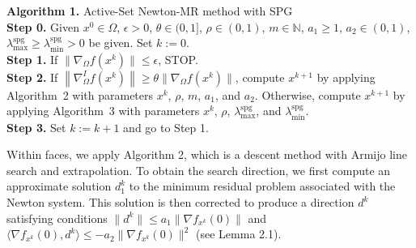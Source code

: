 \documentclass[11pt]{article}
\begin{document}
\begin{mdframed}
\noindent\textbf{Algorithm 1.} Active-Set Newton-MR method with SPG 
\\[0.2cm]
\noindent\textbf{Step 0.} Given $x^{0}\in\Omega$, $\epsilon>0$, $\theta \in (0,1]$, $\rho\in (0,1)$, $m\in\mathbb{N}$, $a_{1}\geq 1$, $a_2\in(0,1)$, $\lambda_{\max}^{\mathrm{spg}} \geq \lambda_{\min}^{\mathrm{spg}}>0$ be given. Set $k:=0$.
\\[0.2cm]
\noindent\textbf{Step 1.} If $\|\nabla_{\Omega}f(x^{k})\|\leq \epsilon$, STOP.
\\[0.2cm]
\noindent\textbf{Step 2.} If $\left\|\nabla_{\Omega}^{I}f(x^{k})\right\|\geq \theta \|\nabla_{\Omega}f(x^{k})\|$, compute $x^{k+1}$ by applying Algorithm~2 with parameters $x^k$, $\rho$, $m$, $a_1$, and $a_2$. Otherwise, compute $x^{k+1}$ by applying Algorithm~3 with parameters $x^k$, $\rho$, $\lambda_{\max}^{\mathrm{spg}}$, and $\lambda_{\min}^{\mathrm{spg}}$.
\\[0.2cm]
\noindent\textbf{Step 3.} Set $k:=k+1$ and go to Step 1.
\end{mdframed}

Within faces, we apply Algorithm 2, which is a descent method with Armijo line search and extrapolation. To obtain the search direction, we first compute an approximate solution $d_1^k$ to the minimum residual problem associated with the Newton system. This solution is then corrected to produce a direction $d^k$ satisfying conditions $\|d^{k}\| \leq a_{1} \|\nabla f_{x^{k}}(0)\|$ and $\langle\nabla f_{x^{k}}(0), d^{k} \rangle \leq -a_{2} \|\nabla f_{x^{k}}(0)\|^{2}$ (see Lemma 2.1).
\end{document}
